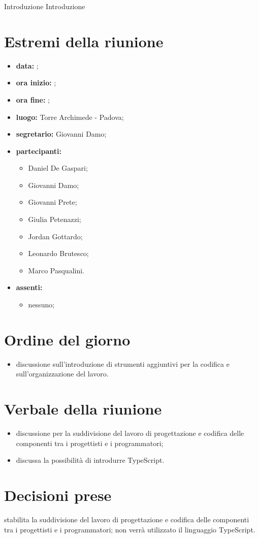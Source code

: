 \documentclass[a4paper,11pt]{article}
\begin{document}
	Introduzione
	Introduzione

	\section{Estremi della riunione}
	\begin{itemize}
		\item \textbf{data:} ;
		\item \textbf{ora inizio:} ;
		\item \textbf{ora fine:} ;
		\item \textbf{luogo:} Torre Archimede - Padova;
		\item \textbf{segretario:} Giovanni Damo;
		\item \textbf{partecipanti:}
			\begin{itemize}
				\item Daniel De Gaspari;
				\item Giovanni Damo;
				\item Giovanni Prete;
				\item Giulia Petenazzi;
				\item Jordan Gottardo;
				\item Leonardo Brutesco;
				\item Marco Pasqualini.
			\end{itemize}
		\item \textbf{assenti:}
			\begin{itemize}
 				\item nessuno;
			\end{itemize}
	\end{itemize}
	\section{Ordine del giorno}
		\begin{itemize}	
			\item discussione sull'introduzione di strumenti aggiuntivi per la codifica e sull'organizzazione del lavoro.
		\end{itemize}
	\section{Verbale della riunione}
		\begin{itemize}
			\item discussione per la suddivisione del lavoro di progettazione e codifica delle componenti tra i progettisti e i programmatori;
            \item discussa la possibilità di introdurre TypeScript.
		\end{itemize}
	\section{Decisioni prese}
		\begin{itemize}
	        \itemVI stabilita la suddivisione del lavoro di progettazione e codifica delle componenti tra i progettisti e i programmatori;
	        \itemVI non verrà utilizzato il linguaggio TypeScript.
		\end{itemize}
\end{document}
